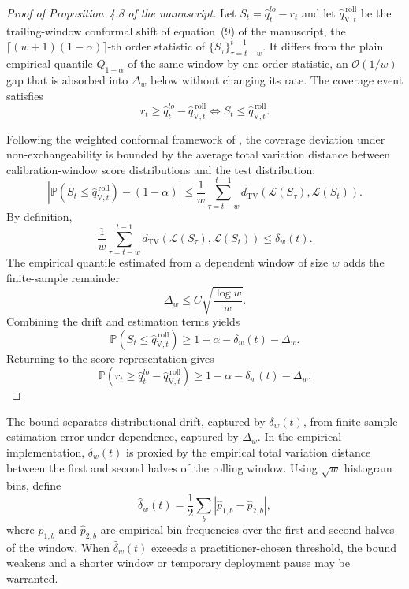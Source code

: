 \documentclass[preprint,11pt,authoryear]{elsarticle}
\newcommand{\1}{\boldsymbol{1}}
\newcommand{\qVroll}{\hat{q}_{{\scriptscriptstyle\mathrm{V}},t}^{\,\mathrm{roll}}}
\begin{document}
\begin{proof}[Proof of Proposition~4.8 of the manuscript]
	Let $S_t=\hat q_t^{lo}-r_t$ and let $\qVroll$ be the trailing-window
	conformal shift of equation~(9) of the manuscript, the
	$\lceil (w+1)(1-\alpha)\rceil$-th order statistic of
	$\{S_\tau\}_{\tau=t-w}^{t-1}$. It differs from the plain empirical quantile
	$Q_{1-\alpha}$ of the same window by one order statistic, an
	$\mathcal O(1/w)$ gap that is absorbed into $\Delta_w$ below without changing
	its rate.
	The coverage event satisfies
	\begin{equation}
		\label{eq:app_rolling_score_event}
		r_t\ge \hat q_t^{lo}-\qVroll
		\Longleftrightarrow
		S_t\le \qVroll.
	\end{equation}
	
	Following the weighted conformal framework of
	\citet{barber2023conformal}, the coverage deviation under
	non-exchangeability is bounded by the average total variation distance
	between calibration-window score distributions and the test distribution:
	\begin{equation}
		\label{eq:app_tv_bound}
		\left|
		\mathbb P(S_t\le\qVroll)-(1-\alpha)
		\right|
		\le
		\frac{1}{w}
		\sum_{\tau=t-w}^{t-1}
		d_{\mathrm{TV}}\!\left(\mathcal L(S_\tau),\mathcal L(S_t)\right).
	\end{equation}
	By definition,
	\[
	\frac{1}{w}
	\sum_{\tau=t-w}^{t-1}
	d_{\mathrm{TV}}\!\left(\mathcal L(S_\tau),\mathcal L(S_t)\right)
	\le
	\delta_w(t).
	\]
	The empirical quantile estimated from a dependent window of size $w$
	adds the finite-sample remainder
	\begin{equation}
		\label{eq:app_delta_w}
		\Delta_w\le C\sqrt{\frac{\log w}{w}}.
	\end{equation}
	Combining the drift and estimation terms yields
	\begin{equation}
		\label{eq:app_rolling_score_bound}
		\mathbb P(S_t\le\qVroll)
		\ge
		1-\alpha-\delta_w(t)-\Delta_w.
	\end{equation}
	Returning to the score representation gives
	\begin{equation}
		\label{eq:app_rolling_bound}
		\mathbb P\!\left(
		r_t\ge \hat q_t^{lo}-\qVroll
		\right)
		\ge
		1-\alpha-\delta_w(t)-\Delta_w.
	\end{equation}
\end{proof}

The bound separates distributional drift, captured by $\delta_w(t)$, from
finite-sample estimation error under dependence, captured by $\Delta_w$.
In the empirical implementation, $\delta_w(t)$ is proxied by the empirical
total variation distance between the first and second halves of the rolling
window. Using $\sqrt w$ histogram bins, define
\begin{equation}
	\label{eq:app_delta_hat}
	\hat\delta_w(t)
	=
	\frac{1}{2}\sum_b |\hat p_{1,b}-\hat p_{2,b}|,
\end{equation}
where $\hat p_{1,b}$ and $\hat p_{2,b}$ are empirical bin frequencies over
the first and second halves of the window. When $\hat\delta_w(t)$ exceeds a
practitioner-chosen threshold, the bound weakens and a shorter window or
temporary deployment pause may be warranted.
\end{document}
